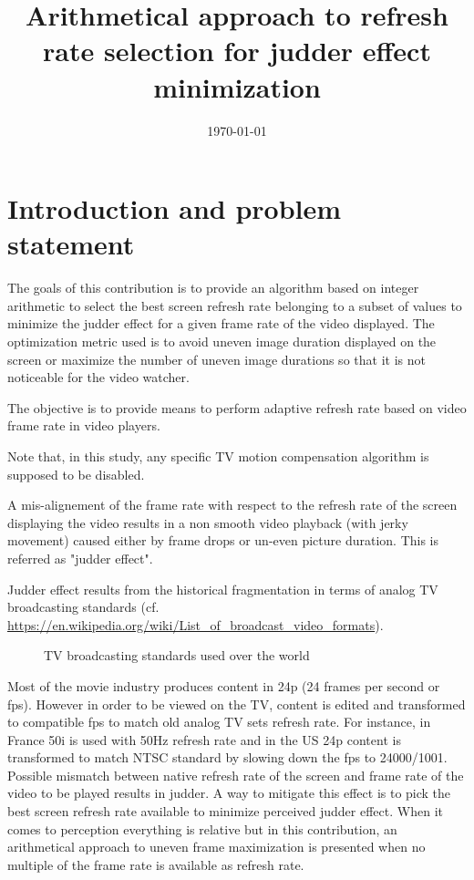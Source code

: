 \documentclass[11pt,a4paper]{article}
\author{\monNom}
\title{Arithmetical approach to refresh rate selection for judder effect minimization}
\date{\today}
\makeatletter
\theoremstyle{plain}
\theoremstyle{definition}
\theoremstyle{remark}
\renewcommand{\maketitle}{
  \thispagestyle{empty}
  \begin{center}
  \shadowbox{\parbox{4in}{%
     \centering%
     \textrm{\textbf{\Large \@title}}\\
     \vspace{0.2cm}
     \textrm{\large \@author}\\
     \vspace{0.2cm}
     \textrm{\large \@date}
  }} 
  \end{center}
  \null
}
\makeatother
\begin{document}
\maketitle

\thispagestyle{fancy}

\section{Introduction and problem statement}

The goals of this contribution is to provide an algorithm based on integer arithmetic to select the best screen refresh rate belonging to a subset of values to minimize the judder effect for a given frame rate of the video displayed. The optimization metric used is to avoid uneven image duration displayed on the screen or maximize the number of uneven image durations so that it is not noticeable for the video watcher.

The objective is to provide means to perform adaptive refresh rate based on video frame rate in video players.

Note that, in this study, any specific TV motion compensation algorithm is supposed to be disabled.

A mis-alignement of the frame rate with respect to the refresh rate of the screen displaying the video results in a non smooth video playback (with jerky movement) caused either by frame drops or un-even picture duration. This is referred as "judder effect". 

Judder effect results from the historical fragmentation in terms of analog TV broadcasting standards (cf. \url{https://en.wikipedia.org/wiki/List_of_broadcast_video_formats}).

\begin{figure}[h]
    \centering
    \def\svgwidth{\columnwidth}
    
    \caption{TV broadcasting standards used over the world}
\end{figure}

Most of the movie industry produces content in 24p (24 frames per second or fps). However in order to be viewed on the TV, content is edited and transformed to compatible fps to match old analog TV sets refresh rate.
For instance, in France 50i is used with 50Hz refresh rate and in the US 24p content is transformed to match NTSC standard by slowing down the fps to 24000/1001.
Possible mismatch between native refresh rate of the screen and frame rate of the video to be played results in judder.
A way to mitigate this effect is to pick the best screen refresh rate available to minimize perceived judder effect.
When it comes to perception everything is relative but in this contribution, an arithmetical approach to uneven frame maximization is presented when no multiple of the frame rate is available as refresh rate.
\end{document}
